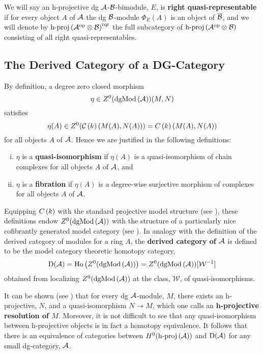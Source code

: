 \documentclass[dissertation.tex]{subfiles}
\begin{document}
We will say an h-projective dg \(\mathcal{A}\)-\(\mathcal{B}\)-bimodule, \(E\), is {\bf right quasi-representable} if for every object \(A\) of \(\mathcal{A}\) the dg \(\mathcal{B}\)-module \(\Phi_E(A)\) is an object of \(\overline{\mathcal{B}}\), and we will denote by \(\operatorname{h-proj}\left(\mathcal{A}^{\operatorname{op}} \otimes \mathcal{B}\right)^{\operatorname{rqr}}\) the full subcategory of \(\operatorname{h-proj}\left(\mathcal{A}^{\operatorname{op}} \otimes \mathcal{B}\right)\) consisting of all right quasi-representables.

\subsection{The Derived Category of a DG-Category}
By definition, a degree zero closed morphism
\[\eta \in Z^0(\operatorname{dgMod}\left(\mathcal{A}\right))(M,N)\]
satisfies
\[\eta(A) \in Z^0(\mathcal{C}\left(k\right)(M(A), N(A))) = C\left(k\right)(M(A), N(A))\]
for all objects \(A\) of \(\mathcal{A}\).
Hence we are justified in the following definitions:
\begin{enumerate}[(i)]
\item
  \(\eta\) is a {\bf quasi-isomorphism} if \(\eta(A)\) is a quasi-isomorphism of chain complexes for all objects \(A\) of \(\mathcal{A}\), and
\item
  \(\eta\) is a {\bf fibration} if \(\eta(A)\) is a degree-wise surjective morphism of complexes for all objects \(A\) of \(\mathcal{A}\).
\end{enumerate}
Equipping \(C\left(k\right)\) with the standard projective model structure (see \cite[Section 2.3]{Hov98}), these definitions endow \(Z^0(\operatorname{dgMod}\left(\mathcal{A}\right))\) with the structure of a particularly nice cofibrantly generated model category (see \cite[Section 3]{Toen}).
In analogy with the definition of the derived category of modules for a ring \(A\), the {\bf derived category of \(\mathcal{A}\)} is defined to be the model category theoretic homotopy category,
\[\mathrm{D}(\mathcal{A}) = \operatorname{Ho}\left(Z^0(\operatorname{dgMod}\left(\mathcal{A}\right))\right) = Z^0(\operatorname{dgMod}\left(\mathcal{A}\right))[\mathcal{W}^{-1}]\]
obtained from localizing \(Z^0(\operatorname{dgMod}\left(\mathcal{A}\right))\) at the class, \(\mathcal{W}\), of quasi-isomorphisms.

It can be shown (see \cite[Section 3.5]{Kel95}) that for every dg \(\mathcal{A}\)-module, \(M\), there exists an h-projective, \(N\), and a quasi-isomorphism \(N \to M\), which one calls an {\bf h-projective resolution of \(M\)}.
Moreover, it is not difficult to see that any quasi-isomorphism between h-projective objects is in fact a homotopy equivalence.
It follows that there is an equivalence of categories between \(H^0(\operatorname{h-proj}\left(\mathcal{A}\right))\) and \(\mathrm{D}(\mathcal{A})\) for any small dg-category, \(\mathcal{A}\).
\end{document}
